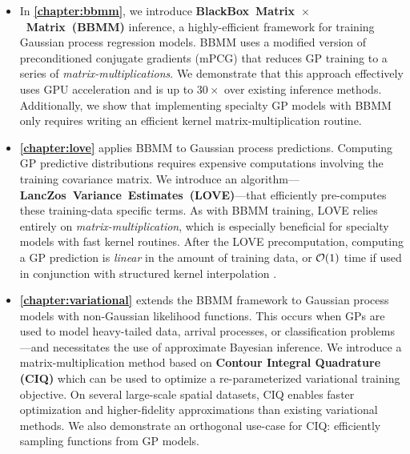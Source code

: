 \begin{itemize}
  \item In {\bf \cref{chapter:bbmm}}, we introduce {\bf BlackBox~Matrix~$\times$~Matrix~(BBMM)} inference, a highly-efficient framework for training Gaussian process regression models.
    BBMM uses a modified version of preconditioned conjugate gradients (mPCG) that reduces GP training to a series of \emph{matrix-multiplications}.
    We demonstrate that this approach effectively uses GPU acceleration and is up to $30\times$ over existing inference methods.
    Additionally, we show that implementing specialty GP models with BBMM only requires writing an efficient kernel matrix-multiplication routine.

  \item {\bf \cref{chapter:love}} applies BBMM to Gaussian process predictions.
    Computing GP predictive distributions requires expensive computations involving the training covariance matrix.
    We introduce an algorithm---{\bf LancZos~Variance~Estimates~(LOVE)}---that efficiently pre-computes these training-data specific terms.
    As with BBMM training, LOVE relies entirely on \emph{matrix-multiplication}, which is especially beneficial for specialty models with fast kernel routines.
    After the LOVE precomputation, computing a GP prediction is \emph{linear} in the amount of training data, or $\bigo{1}$ time if used in conjunction with structured kernel interpolation \cite{wilson2015kernel}.

  \item {\bf \cref{chapter:variational}} extends the BBMM framework to Gaussian process models with non-Gaussian likelihood functions.
    This occurs when GPs are used to model heavy-tailed data, arrival processes, or classification problems---and necessitates the use of approximate Bayesian inference.
    We introduce a matrix-multiplication method based on {\bf Contour Integral Quadrature (CIQ)} which can be used to optimize a re-parameterized variational training objective.
    On several large-scale spatial datasets, CIQ enables faster optimization and higher-fidelity approximations than existing variational methods.
    We also demonstrate an orthogonal use-case for CIQ: efficiently sampling functions from GP models.


\end{itemize}
